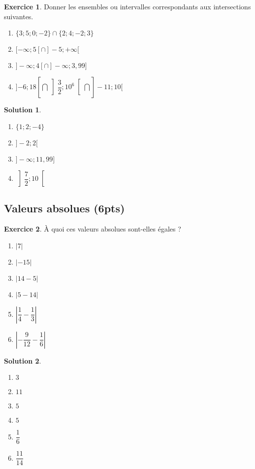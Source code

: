 \documentclass[a4paper, 14pt]{extarticle}
\theoremstyle{plain}
\newtheorem*{sol}{Solution}
\theoremstyle{definition}
\newtheorem{ex}{Exercice}
\newcommand{\vabs}[1]{
	\left| #1 \right|
}
\newcommand{\pinfty}{{+}\infty}
\newcommand{\minfty}{{-}\infty}
\newcommand{\exe}[2]{
		\begin{ex} #1  \end{ex}
		\begin{sol} #2 \end{sol}
	}
\newcommand{\exe}[2]{
		\begin{ex} #1  \end{ex}
	}
\begin{document}
\exe{
	Donner les ensembles ou intervalles correspondants aux intersections suivantes.
	\begin{multicols}{2}
	\begin{enumerate}
		\item $\{ 3 ; 5 ; 0 ; -2 \} \cap \{  2; 4 ; -2 ; 3\}$
		\item $[\minfty ; 5[ \cap ]{-}5 ; \pinfty[$
		\item $ ]\minfty ; 4[ \cap ]\minfty ; 3{,}99]$
		\item $]{-6};18[ \bigcap \left]\dfrac32; 10^6\right[ \bigcap ]{-}11; 10[$
	\end{enumerate}
	\end{multicols}
}
{

	\begin{multicols}{2}
	\begin{enumerate}
		\item $\{ 1 ; 2 ; -4\}$
		\item $]-2; 2[$
		\item $]\minfty ; 11{,}99]$
		\item $\left]\dfrac72 ; 10\right[$
	\end{enumerate}
	\end{multicols}

}


\subsection*{Valeurs absolues (6pts)}


\exe{
	À  quoi ces valeurs absolues sont-elles égales ?
	\begin{multicols}{2}
	\begin{enumerate}
		\item $\vabs{7}$
		\item $\vabs{-15}$
		\item $\vabs{14 - 5}$
		\item $\vabs{5-14}$
		\item $\vabs{\dfrac14 - \dfrac13}$
		\item $\vabs{-\dfrac9{12} - \dfrac16}$
	\end{enumerate}
	\end{multicols}
}
{

	\begin{multicols}{2}
	\begin{enumerate}
		\item $3$
		\item $11$
		\item $5$
		\item $5$
		\item $\dfrac16$
		\item $\dfrac{11}{14}$
	\end{enumerate}
	\end{multicols}

}
\end{document}
